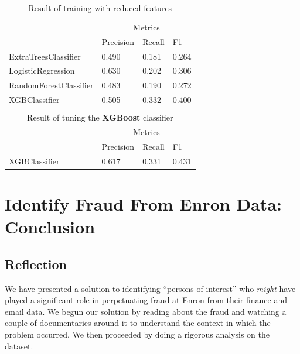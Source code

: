 \documentclass[twoside,openright,titlepage,numbers=noenddot,headinclude,%
               footinclude=true,cleardoublepage=empty,abstractoff,BCOR=5mm,%
               paper=a4,fontsize=11pt,ngerman,american]{scrreprt}
\numberwithin{theorem}{chapter}
\numberwithin{definition}{chapter}
\numberwithin{algorithm}{chapter}
\numberwithin{figure}{chapter}
\numberwithin{table}{chapter}
\numberwithin{equation}{chapter}
\begin{document}
\setlength{\extrarowheight}{1.5pt}
\begin{table}[!htbp]
\caption{Result of training with reduced features} %
\centering %
\begin{tabular}{|p{6cm}|p{1.5cm}|p{1.5cm}|p{1.5cm}|} %
\hline %
& \multicolumn{3}{c|}{Metrics}\\[5pt]
\cline{2-4} 
& Precision & Recall & F1\\[0.5ex]
\hline %

ExtraTreesClassifier     &  0.490       &  0.181     &  0.264     \\ 
LogisticRegression       &  0.630       &  0.202     &  0.306     \\ 
RandomForestClassifier   &  0.483       &  0.190     &  0.272     \\ 
XGBClassifier            &  0.505       &  0.332     &  0.400     \\ 
\hline%

\multicolumn{4}{|c|}{}\\
\multicolumn{4}{|c|}{Result of tuning the \textbf{XGBoost} classifier}\\[5pt]
\hline
& \multicolumn{3}{c|}{Metrics}\\[5pt]
\cline{2-4} 
& Precision & Recall & F1\\[0.5ex]
\hline %

XGBClassifier           &  0.617  & 0.331  & 0.431\\ 
\hline
\end{tabular}
\label{tableReducedFeatures}
\end{table}


\chapter*{Identify Fraud From Enron Data: Conclusion}


\section*{Reflection}

We have presented a solution to identifying ``persons of interest'' who \textit{might} have played a significant role in perpetuating fraud at Enron from their finance and email data. We begun our solution by reading about the fraud and watching a couple of documentaries around it to understand the context in which the problem occurred. We then proceeded by doing a rigorous analysis on the dataset. 
\end{document}
